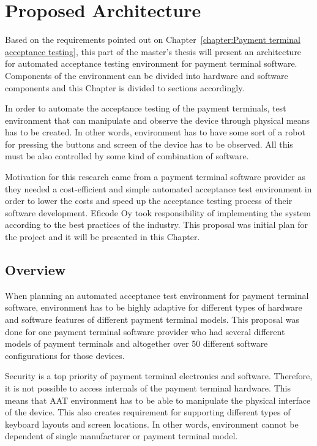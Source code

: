 
\chapter{Proposed Architecture}
\label{chapter:Proposed architecture}

Based on the requirements pointed out on Chapter~\ref{chapter:Payment terminal acceptance testing}, this part of the master's thesis will present an architecture for automated acceptance testing environment for payment terminal software. Components of the environment can be divided into hardware and software components and this Chapter is divided to sections accordingly.

In order to automate the acceptance testing of the payment terminals, test environment that can manipulate and observe the device through physical means has to be created. In other words, environment has to have some sort of a robot for pressing the buttons and screen of the device has to be observed. All this must be also controlled by some kind of combination of software.

Motivation for this research came from a payment terminal software provider as they needed a cost-efficient and simple automated acceptance test environment in order to lower the costs and speed up the acceptance testing process of their software development. Eficode Oy took responsibility of implementing the system according to the best practices of the industry. This proposal was initial plan for the project and it will be presented in this Chapter.

\section{Overview}

When planning an automated acceptance test environment for payment terminal software, environment has to be highly adaptive for different types of hardware and software features of different payment terminal models. This proposal was done for one payment terminal software provider who had several different models of payment terminals and altogether over 50 different software configurations for those devices.

Security is a top priority of payment terminal electronics and software. Therefore, it is not possible to access internals of the payment terminal hardware. This means that AAT environment has to be able to manipulate the physical interface of the device. This also creates requirement for supporting different types of keyboard layouts and screen locations. In other words, environment cannot be dependent of single manufacturer or payment terminal model.

